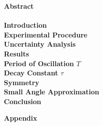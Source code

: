 \documentclass{article}
\begin{document}


\noindent\Large{\textbf{Abstract}}\normalsize\\

 \\

\noindent\Large{\textbf{Introduction}}\normalsize\\



\noindent\Large{\textbf{Experimental Procedure}}\normalsize\\



\noindent\Large{\textbf{Uncertainty Analysis}}\normalsize\\



\noindent\Large{\textbf{Results}}\normalsize\\

\noindent\large{\textbf{Period of Oscillation $T$}}\normalsize\\


\noindent\large{\textbf{Decay Constant $\tau$}}\normalsize\\



\noindent\large{\textbf{Symmetry}}\normalsize\\



\noindent\large{\textbf{Small Angle Approximation}}\normalsize\\



\noindent\Large{\textbf{Conclusion}}\normalsize\\


\pagebreak

\printbibliography

\noindent\Large{\textbf{Appendix}}\normalsize\\

\end{document}
